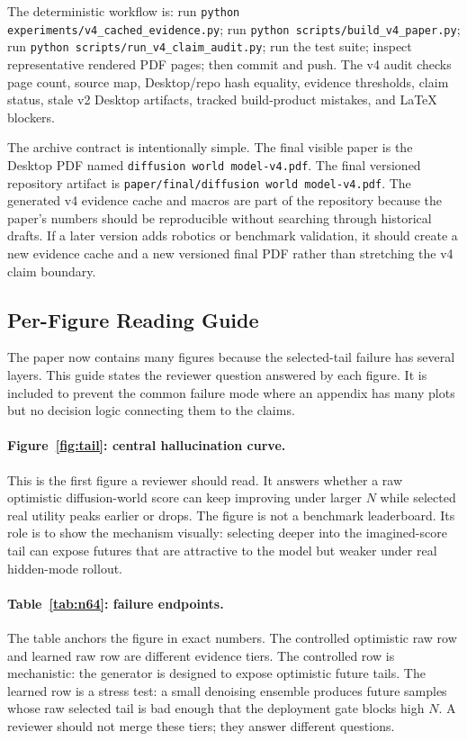 \documentclass{article}
\begin{document}
The deterministic workflow is: run
\texttt{python experiments/v4\_cached\_evidence.py}; run
\texttt{python scripts/build\_v4\_paper.py}; run
\texttt{python scripts/run\_v4\_claim\_audit.py}; run the test suite; inspect
representative rendered PDF pages; then commit and push. The v4 audit checks
page count, source map, Desktop/repo hash equality, evidence thresholds,
claim status, stale v2 Desktop artifacts, tracked build-product mistakes, and
LaTeX blockers.

The archive contract is intentionally simple. The final visible paper is the
Desktop PDF named \texttt{diffusion world model-v4.pdf}. The final versioned
repository artifact is \texttt{paper/final/diffusion world model-v4.pdf}. The
generated v4 evidence cache and macros are part of the repository because the
paper's numbers should be reproducible without searching through historical
drafts. If a later version adds robotics or benchmark validation, it should
create a new evidence cache and a new versioned final PDF rather than
stretching the v4 claim boundary.

\subsection{Per-Figure Reading Guide}
\label{app:v4-figure-guide}

The paper now contains many figures because the selected-tail failure has
several layers. This guide states the reviewer question answered by each
figure. It is included to prevent the common failure mode where an appendix has
many plots but no decision logic connecting them to the claims.

\paragraph{Figure~\ref{fig:tail}: central hallucination curve.}
This is the first figure a reviewer should read. It answers whether a raw
optimistic diffusion-world score can keep improving under larger $N$ while
selected real utility peaks earlier or drops. The figure is not a benchmark
leaderboard. Its role is to show the mechanism visually: selecting deeper into
the imagined-score tail can expose futures that are attractive to the model
but weaker under real hidden-mode rollout.

\paragraph{Table~\ref{tab:n64}: failure endpoints.}
The table anchors the figure in exact numbers. The controlled optimistic raw
row and learned raw row are different evidence tiers. The controlled row is
mechanistic: the generator is designed to expose optimistic future tails. The
learned row is a stress test: a small denoising ensemble produces future
samples whose raw selected tail is bad enough that the deployment gate blocks
high $N$. A reviewer should not merge these tiers; they answer different
questions.
\end{document}
